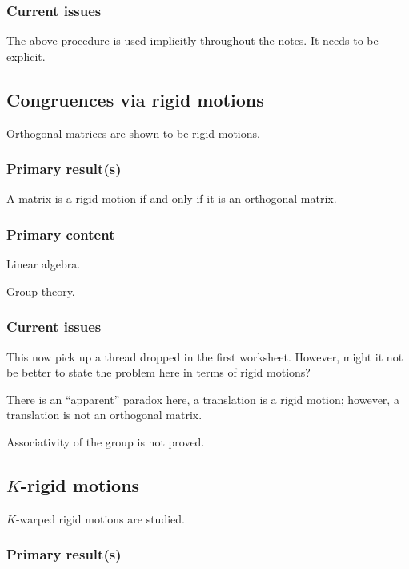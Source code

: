 \documentclass{amsart}
\begin{document}
\subsubsection{Current issues}

The above procedure is used implicitly throughout the notes. It needs
to be explicit.




\subsection{Congruences via rigid motions}

Orthogonal matrices are shown to be rigid motions.

\subsubsection{Primary result(s)}

A matrix is a rigid motion if and only if it is an orthogonal matrix. 

\subsubsection{Primary content}

Linear algebra.

Group theory.


\subsubsection{Current issues}

This now pick up a thread dropped in the first worksheet. However,
might it not be better to state the problem here in terms of rigid motions?

There is an ``apparent'' paradox here, a translation is a rigid
motion; however, a translation is not an orthogonal matrix.

Associativity of the group is not proved.




\subsection{$K$-rigid motions}

$K$-warped rigid motions are studied.

\subsubsection{Primary result(s)}
\end{document}
